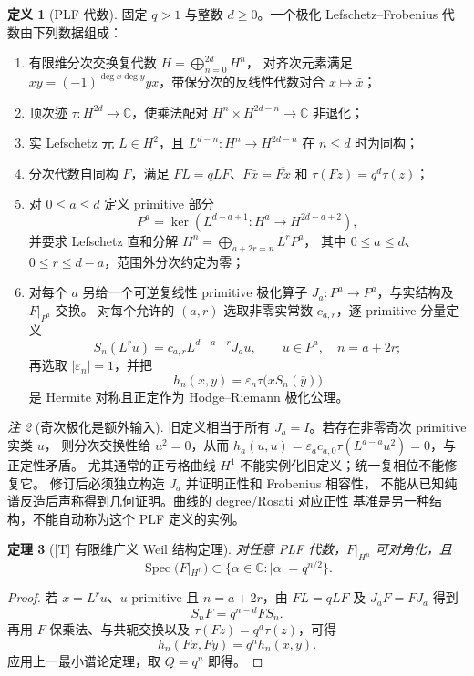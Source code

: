 \documentclass[UTF8,11pt,a4paper]{ctexart}
\newtheorem{theorem}{定理}[section]
\theoremstyle{definition}
\newtheorem{definition}[theorem]{定义}
\theoremstyle{remark}
\newtheorem{remark}[theorem]{注}
\newcommand{\C}{\mathbb C}
\newcommand{\Spec}{\operatorname{Spec}}
\newcommand{\1}{\mathbf 1}
\newcommand{\statusT}{\textnormal{[T]}}
\begin{document}
\begin{definition}[PLF 代数]
固定 $q>1$ 与整数 $d\geq0$。一个极化 Lefschetz--Frobenius 代数由下列数据组成：
\begin{enumerate}
  \item 有限维分次交换复代数 $H=\bigoplus_{n=0}^{2d}H^n$，
  对齐次元素满足 $xy=(-1)^{\deg x\deg y}yx$，带保分次的反线性代数对合 $x\mapsto\bar x$；
  \item 顶次迹 $\tau:H^{2d}\to\C$，使乘法配对 $H^n\times H^{2d-n}\to\C$ 非退化；
  \item 实 Lefschetz 元 $L\in H^2$，且 $L^{d-n}:H^n\to H^{2d-n}$ 在 $n\leq d$ 时为同构；
  \item 分次代数自同构 $F$，满足 $FL=qLF$、$F\bar x=\overline{Fx}$ 和 $\tau(Fz)=q^d\tau(z)$；
  \item 对 $0\leq a\leq d$ 定义 primitive 部分
  \[
    P^a=\ker\!\left(L^{d-a+1}:H^a\longrightarrow H^{2d-a+2}\right),
  \]
  并要求 Lefschetz 直和分解 $H^n=\bigoplus_{a+2r=n}L^rP^a$，
  其中 $0\leq a\leq d$、$0\leq r\leq d-a$，范围外分次约定为零；
  \item 对每个 $a$ 另给一个可逆复线性 primitive 极化算子
  $J_a:P^a\to P^a$，与实结构及 $F|_{P^a}$ 交换。
  对每个允许的 $(a,r)$ 选取非零实常数 $c_{a,r}$，逐 primitive 分量定义
  \[
    S_n(L^ru)=c_{a,r}L^{d-a-r}J_au,
    \qquad u\in P^a,\quad n=a+2r;
  \]
  再选取 $|\varepsilon_n|=1$，并把
  \[
    h_n(x,y)=\varepsilon_n\tau\bigl(xS_n(\bar y)\bigr)
  \]
  是 Hermite 对称且正定作为 Hodge--Riemann 极化公理。
\end{enumerate}
\end{definition}

\begin{remark}[奇次极化是额外输入]\label{rem:odd-polarization}
旧定义相当于所有 $J_a=I$。若存在非零奇次 primitive 实类 $u$，
则分次交换性给 $u^2=0$，从而
$h_a(u,u)=\varepsilon_ac_{a,0}\tau(L^{d-a}u^2)=0$，与正定性矛盾。
尤其通常的正亏格曲线 $H^1$ 不能实例化旧定义；统一复相位不能修复它。
修订后必须独立构造 $J_a$ 并证明正性和 Frobenius 相容性，
不能从已知纯谱反造后声称得到几何证明。曲线的 degree/Rosati 对应正性
基准是另一种结构，不能自动称为这个 PLF 定义的实例。
\end{remark}

\begin{theorem}[\statusT{} 有限维广义 Weil 结构定理]\label{thm:plf}
对任意 PLF 代数，$F|_{H^n}$ 可对角化，且
\[
  \Spec(F|_{H^n})\subset\{\alpha\in\C:|\alpha|=q^{n/2}\}.
\]
\end{theorem}

\begin{proof}
若 $x=L^ru$、$u$ primitive 且 $n=a+2r$，由 $FL=qLF$ 及 $J_aF=FJ_a$ 得到
\[
  S_nF=q^{n-d}FS_n.
\]
再用 $F$ 保乘法、与共轭交换以及 $\tau(Fz)=q^d\tau(z)$，可得
\[
  h_n(Fx,Fy)=q^nh_n(x,y).
\]
应用上一最小谱论定理，取 $Q=q^n$ 即得。
\end{proof}
\end{document}

